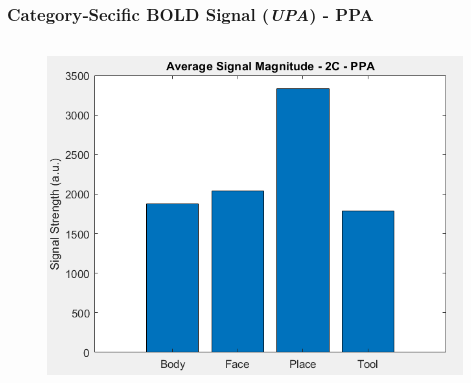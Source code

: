 \begin{frame}
\frametitle{Category‐Secific BOLD Signal (\textit{UPA}) - PPA}
	\begin{columns}
		\begin{column}{0.5\textwidth}
			\begin{figure}
				\centering
				\includegraphics[width=0.98\textwidth]{assets/upa_2C_ppa.png}
			\end{figure}
		\end{column}


\end{columns}
\end{frame}
